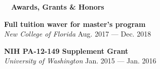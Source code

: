 \documentclass[a4paper,12pt]{article}
\newcommand{\resheading}[1]{{\hspace{-9pt} \colorbox{mygrey}{\begin{minipage}{\textwidth}{\textmd{~~\large \textbf{#1} \vphantom{p\^{E}}}}\end{minipage}}\vspace{6pt}} }
\newcommand{\ressubheading}[4]{{\begin{minipage}{\textwidth}
                                    \textbf{#1} \hfill #2 \\
                                    \textit{#3} \hfill #4 \\
\end{minipage}}}
\begin{document}



    \resheading{Awards, Grants \& Honors}
    \ressubheading{Full tuition waver for master's program}{}{New College of Florida}{Aug. 2017 ---  Dec. 2018}

    \ressubheading{NIH PA-12-149 Supplement Grant}{}{University of Washington}{Jan. 2015 --- Jan. 2016}
\end{document}
